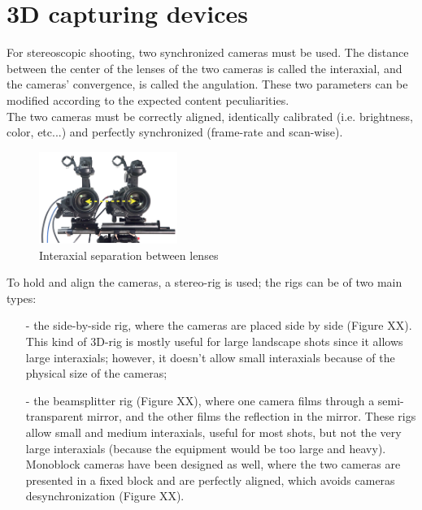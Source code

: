 \section{3D capturing devices}
For stereoscopic shooting, two synchronized cameras must be used. The distance between the center of the lenses of the two cameras is called the interaxial, and the cameras' convergence, is called the angulation. These two parameters can be modified according to the expected content peculiarities.\\
The two cameras must be correctly aligned, identically calibrated (i.e. brightness, color, etc...) and perfectly synchronized (frame-rate and scan-wise).\\
\begin{figure}[h!]
\centering
\includegraphics[width=0.4\textwidth]{./img/interaxial-separation.png}
\caption{\small{Interaxial separation between lenses}}
\label{fig:interaxial}
\end{figure}
To hold and align the cameras, a stereo-rig is used; the rigs can be of two main types:\\
\begin{itemize}
\item[-] the side-by-side rig, where the cameras are placed side by side (Figure XX). This kind of 3D-rig is mostly useful for large landscape shots since it allows large interaxials; however, it doesn't allow small interaxials because of the physical size of the cameras;
\item[-] the beamsplitter rig (Figure XX), where one camera films through a semi-transparent mirror, and the other films the reflection in the mirror. These rigs allow small and medium interaxials, useful for most shots, but not the very large interaxials (because the equipment would be too large and heavy).\\
Monoblock cameras have been designed as well, where the two cameras are presented in a fixed block
and are perfectly aligned, which avoids cameras desynchronization (Figure XX).\\
\end{itemize}
